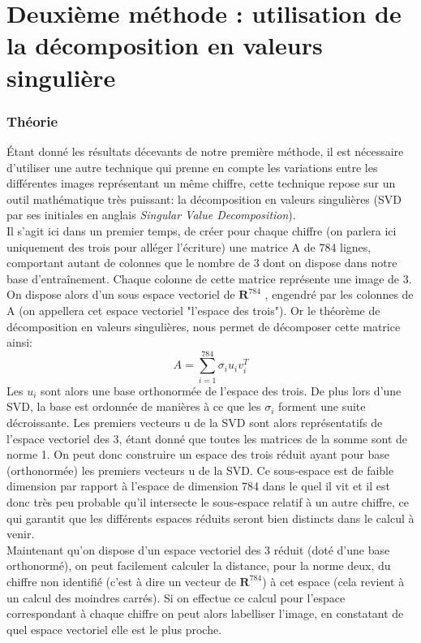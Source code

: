 \documentclass[a4paper,11pt,twoside]{report}
\begin{document}
\chapter{Deuxième méthode : utilisation de la décomposition en valeurs singulière}
\subsection{Théorie}
Étant donné les résultats décevants de notre première méthode, il est nécessaire d'utiliser une autre technique qui prenne en compte les variations entre les différentes images représentant un même chiffre, cette technique repose sur un outil mathématique très puissant: la décomposition en valeurs singulières (SVD par ses initiales en anglais \textit{Singular Value Decomposition}).\\
Il s'agit ici dans un premier temps, de créer pour chaque chiffre (on parlera ici uniquement des trois pour alléger l'écriture) une matrice A de 784 lignes, comportant autant de colonnes que le nombre de 3 dont on dispose dans notre base d’entraînement. Chaque colonne de cette matrice représente une image de 3. On dispose alors d'un sous espace vectoriel de $\textbf{R}^{784}$ , engendré par les colonnes de A (on appellera cet espace vectoriel "l'espace des trois"). Or le théorème de décomposition en valeurs singulières, nous permet de décomposer cette matrice ainsi: $$A = \sum_{i=1}^{784}{\sigma_{i}u_{i}v_{i}^{T}}$$
Les $u_{i}$ sont alors une base orthonormée de l'espace des trois. De plus lors d'une SVD, la base est ordonnée de manières à ce que les $\sigma_{i}$ forment une suite décroissante. Les premiers vecteurs u de la SVD sont alors représentatifs de l'espace vectoriel des 3, étant donné que toutes les matrices de la somme sont de norme 1. On peut donc construire un espace des trois réduit ayant pour base (orthonormée) les premiers vecteurs u de la SVD. Ce sous-espace est de faible dimension par rapport à l'espace de dimension 784 dans le quel il vit et il est donc très peu probable qu'il intersecte le sous-espace relatif à un autre chiffre, ce qui garantit que les différents espaces réduits seront bien distincts dans le calcul à venir.\\
Maintenant qu'on dispose d'un espace vectoriel des 3 réduit (doté d'une base orthonormé), on peut facilement calculer la distance, pour la norme deux, du chiffre non identifié (c'est à dire un vecteur de  $\textbf{R}^{784}$) à cet espace (cela revient à un calcul des moindres carrés). Si on effectue ce calcul pour l'espace correspondant à chaque chiffre on peut alors labelliser l'image, en constatant de quel espace vectoriel elle est le plus proche.
\end{document}
